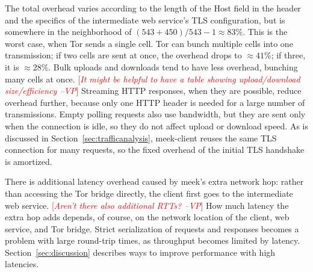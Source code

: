 \documentclass{sig-alternate}
\newcommand{\meekclient}{\mbox{meek-client}\xspace}
\newcommand{\note}[1]{{\textcolor{red}{[\textit{#1}]}}}
\newcommand{\vp}[1]{\note{#1 --VP}}
\begin{document}
\noindent
The total overhead varies according to the length
of the Host field in the header and the specifics of the intermediate web service's TLS configuration,
but is somewhere in the neighborhood of $(543+450)/543-1\approx83$\%.
This is the worst case, when Tor sends a single cell.
Tor can bunch multiple cells into one transmission;
if two cells are sent at once, the overhead drops to
${\approx}41$\%; if three, it is ${\approx}28$\%.
Bulk uploads and downloads tend to have less overhead, bunching many cells at once.
\vp{It might be helpful to have a table showing upload/download size/efficiency}
Streaming HTTP responses, when they are possible, reduce overhead further,
because only one HTTP header is needed for a large number of transmissions.
Empty polling requests also use bandwidth,
but they are sent only when the connection is idle,
so they do not affect upload or download speed.
As is discussed in Section~\ref{sec:trafficanalysis},
\meekclient reuses the same TLS connection for many requests,
so the fixed overhead of the initial TLS handshake is amortized.


There is additional latency overhead caused by meek's extra network hop:
rather than accessing the Tor bridge directly,
the client first goes to the intermediate web service.
\vp{Aren't there also additional RTTs?}
How much latency the extra hop adds depends, of course, on the network location
of the client, web service, and Tor bridge.
Strict serialization of requests and responses
becomes a problem with large round-trip times,
as throughput becomes limited by latency.
Section~\ref{sec:discussion} describes ways to improve
performance with high latencies.
\end{document}
